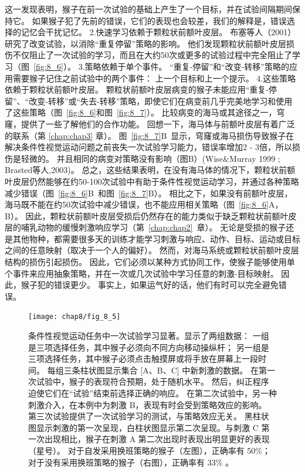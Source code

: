这一发现表明，猴子在前一次试验的基础上产生了一个目标，并在试验间隔期间保持它。
如果猴子犯了先前的错误，它们的表现也会较差，我们的解释是，错误选择的记忆会干扰记忆。
2.快速学习依赖于颗粒状前额叶皮层。
布塞等人（2001）研究了改变试验，以消除“重复停留”策略的影响。
他们发现颗粒状前额叶皮层损伤不仅阻止了一次试验的学习，而且在大约50次或更多的试验过程中完全阻止了学习（图~\ref{fig:8_6}）。
3.策略依赖于单个事件。
“重复-停留”和“改变-转移”策略的应用需要猴子记住之前试验中的两个事件：
上一个目标和上一个提示。
4.这些策略依赖于颗粒状前额叶皮层。
颗粒状前额叶皮层病变的猴子未能应用“重复-停留”、“改变-转移”或“失去-转移”策略，即使它们在病变前几乎完美地学习和使用了这些策略（图~\ref{fig:8_6}和图~\ref{fig:8_7}）。
比较病变的海马或其途径之一，穹窿，提供了一些了解他们的合作功能。
回想一下，海马体与前额叶皮层有着广泛的联系（第 \ref{chap:chap3} 章）。
图~\ref{fig:8_7}B~显示，穹窿或海马损伤导致猴子在解决条件性视觉运动问题之前丧失一次试验学习能力，错误率增加2 - 3倍，所以损伤是轻微的。
并且相同的病变对策略没有影响（图B）(Wise\&Murray 1999 ; Brasted等人,2003)。
总之，这些结果表明，在没有海马体的情况下，颗粒状前额叶皮层仍然能够在约50-100次试验中有助于条件性视觉运动学习，并通过各种策略减少错误（图~\ref{fig:8_6}B~和图~\ref{fig:8_7}B）。
相比之下，如果没有前额叶皮层，海马既不能在约50次试验中减少错误，也不能应用相关策略（图~\ref{fig:8_6}A，B）。
因此，颗粒状前额叶皮层受损后仍然存在的能力类似于缺乏颗粒状前额叶皮层的哺乳动物的缓慢刺激响应学习（第~\ref{chap:chap2}~章）。
无论是受损的猴子还是其他物种，都需要很多天的训练才能学习刺激与响应、动作、目标、运动或目标之间的任意映射（取决于一个人的偏好）。
然而，对海马系统或颗粒状前额叶皮层结构的损伤引起损伤。
因此，它们必须以某种方式协同工作，使猴子能够使用单个事件来应用抽象策略，并在一次或几次试验中学习任意的刺激-目标映射。
因此，猴子犯的错误更少。
事实上，如果运气好的话，他们有时可以完全避免错误。


\begin{figure} 
	\centering
	\texttt{[image: chap8/fig\_8\_5]}
	\caption{条件性视觉运动任务中一次试验学习显著。显示了两组数据：
		一组是三项选择任务，其中猴子必须向不同方向移动操纵杆；
		另一组是三项选择任务，其中猴子必须点击触摸屏或将手放在屏幕上一段时间。
		每组三条柱状图显示集合 [A、B、C] 中新刺激的数据。
		在第一次试验中，猴子的表现符合预期，处于随机水平。
		然后，纠正程序迫使它们在“试验”结束前选择正确的响应。
		在第二次试验中，另一种刺激介入，在本例中为刺激 B，表现有时会受到策略效应的影响。
		第三次试验提供了一次试验学习的测试，与策略效应无关。
		黑柱状图显示刺激的第一次呈现，白柱状图显示第二次呈现。与刺激 C 第一次出现相比，猴子在刺激 A 第二次出现时表现出明显更好的表现（星号）。
		对于自发采用换班策略的猴子（左图），正确率有 50\%；对于没有采用换班策略的猴子（右图），正确率有 33\% \cite{murray2002arbitrary,brasted2005conditional}。 \label{fig:8_5}}
\end{figure}



